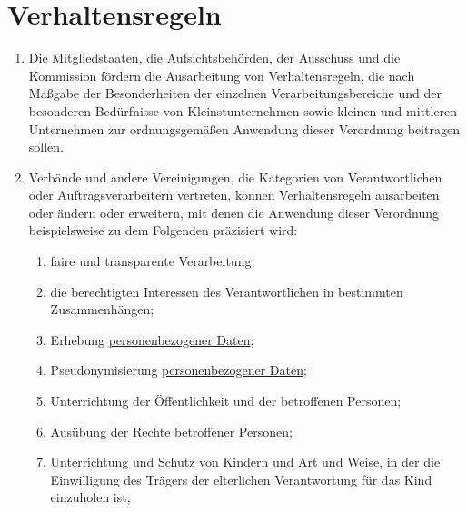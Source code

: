 \chapter{Verhaltensregeln}
\label{ch:40}


\begin{enumerate}

  \item Die Mitgliedstaaten, die Aufsichtsbehörden, der Ausschuss und die Kommission fördern die Ausarbeitung von
   Verhaltensregeln, die nach Maßgabe der Besonderheiten der einzelnen Verarbeitungsbereiche und der besonderen
   Bedürfnisse von Kleinstunternehmen sowie kleinen und mittleren Unternehmen zur ordnungsgemäßen Anwendung dieser
   Verordnung beitragen sollen.
  \label{itm:40-1}

  \item Verbände und andere Vereinigungen, die Kategorien von Verantwortlichen oder Auftragsverarbeitern vertreten,
   können Verhaltensregeln ausarbeiten oder ändern oder erweitern, mit denen die Anwendung dieser Verordnung
   beispielsweise zu dem Folgenden präzisiert wird:
  \label{itm:40-2}

  \begin{enumerate}
  
    \item faire und transparente Verarbeitung;
    \label{itm:40-2a}

    \item die berechtigten Interessen des Verantwortlichen in bestimmten Zusammenhängen;
    \label{itm:40-2b}

    \item Erhebung \hyperref[itm:04-1]{personenbezogener Daten};
    \label{itm:40-2c}

    \item Pseudonymisierung \hyperref[itm:04-1]{personenbezogener Daten};
    \label{itm:40-2d}

    \item Unterrichtung der Öffentlichkeit und der betroffenen Personen;
    \label{itm:40-2e}

    \item Ausübung der Rechte betroffener Personen;
    \label{itm:40-2f}

    \item Unterrichtung und Schutz von Kindern und Art und Weise, in der die Einwilligung des Trägers der elterlichen
     Verantwortung für das Kind einzuholen ist;
    \label{itm:40-2g}


\end{enumerate}
\end{enumerate}
